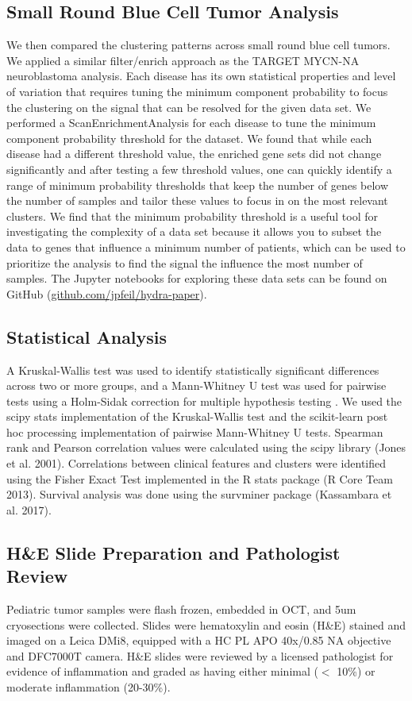 \documentclass[10pt,letterpaper]{article}
\begin{document}
\subsection{Small Round Blue Cell Tumor Analysis}
We then compared the clustering patterns across small round blue cell tumors. We applied a similar filter/enrich approach as the TARGET MYCN-NA neuroblastoma analysis. Each disease has its own statistical properties and level of variation that requires tuning the minimum component probability to focus the clustering on the signal that can be resolved for the given data set. We performed a ScanEnrichmentAnalysis for each disease to tune the minimum component probability threshold for the dataset. We found that while each disease had a different threshold value, the enriched gene sets did not change significantly and after testing a few threshold values, one can quickly identify a range of minimum probability thresholds that keep the number of genes below the number of samples and tailor these values to focus in on the most relevant clusters. We find that the minimum probability threshold is a useful tool for investigating the complexity of a data set because it allows you to subset the data to genes that influence a minimum number of patients, which can be used to prioritize the analysis to find the signal the influence the most number of samples. The Jupyter notebooks for exploring these data sets can be found on GitHub (\url{github.com/jpfeil/hydra-paper}).

\subsection{Statistical Analysis}
A Kruskal-Wallis test was used to identify statistically significant differences across two or more groups, and a Mann-Whitney U test was used for pairwise tests using a Holm-Sidak correction for multiple hypothesis testing \cite{pedregosa2011scikit,jonesSciPyOpenSource2001}. We used the scipy stats implementation of the Kruskal-Wallis test and the scikit-learn post hoc processing implementation of pairwise Mann-Whitney U tests. Spearman rank and Pearson correlation values were calculated using the scipy library (Jones et al. 2001). Correlations between clinical features and clusters were identified using the Fisher Exact Test implemented in the R stats package (R Core Team 2013). Survival analysis was done using the survminer package (Kassambara et al. 2017). 

\subsection{H\&E Slide Preparation and Pathologist Review}
Pediatric tumor samples were flash frozen, embedded in OCT, and 5um cryosections were collected. Slides were hematoxylin and eosin (H\&E) stained and imaged on a Leica DMi8, equipped with a HC PL APO 40x/0.85 NA objective and DFC7000T camera. H\&E slides were reviewed by a licensed pathologist for evidence of inflammation and graded as having either minimal ($<$ 10\%) or moderate inflammation (20-30\%).
\end{document}
